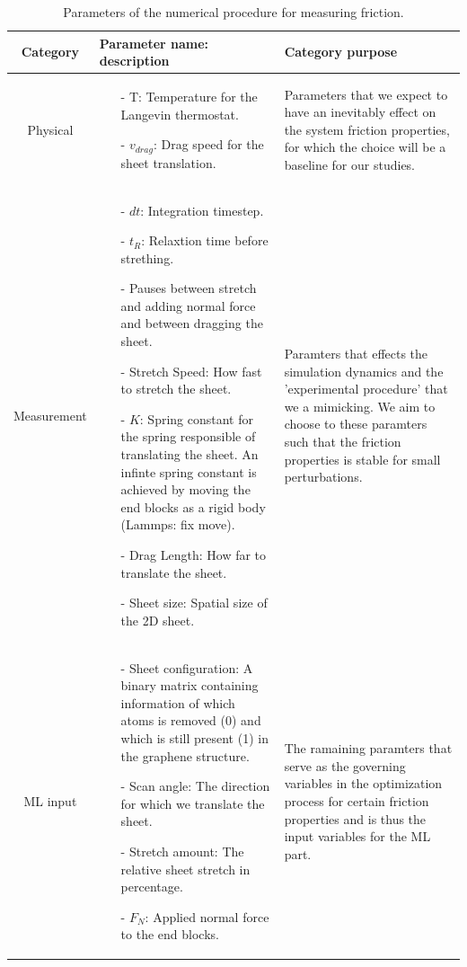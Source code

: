 \begin{table}[H]
  \begin{center}
  \caption{Parameters of the numerical procedure for measuring friction.}
  \label{tab:param}
  \begin{tabular}{ | c | m{8cm}| m{5cm}|} 
    \hline
    Category & Parameter name: description & Category purpose \\ 
    \hline
    Physical & 
    \begin{itemize}
      \item[-] T: Temperature for the Langevin thermostat.
      \item[-] $v_{drag}$: Drag speed for the sheet translation.
    \end{itemize} &
    Parameters that we expect to have an inevitably effect on the system friction properties, for which the choice will be a baseline for our studies.
    \\ \hline
    Measurement & 
    \begin{itemize}
      \item[-] $dt$: Integration timestep.
      \item[-] $t_R$: Relaxtion time before strething.
      \item[-] Pauses between stretch and adding normal force and between dragging the sheet.  
      \item[-] Stretch Speed: How fast to stretch the sheet.
      \item[-] $K$: Spring constant for the spring responsible of translating the sheet. An infinte spring constant is achieved by moving the end blocks as a rigid body (Lammps: fix move).
      \item[-] Drag Length: How far to translate the sheet.
      \item[-] Sheet size: Spatial size of the 2D sheet.  
    \end{itemize} &
    Paramters that effects the simulation dynamics and the 'experimental procedure' that we a mimicking. We aim to choose to these paramters such that the friction properties is stable for small perturbations.  \\ \hline
    ML input & 
    \begin{itemize}
      \item[-] Sheet configuration: A binary matrix containing information of which atoms is removed (0) and which is still present (1) in the graphene structure.
      \item[-] Scan angle: The direction for which we translate the sheet.
      \item[-] Stretch amount: The relative sheet stretch in percentage.
      \item[-] $F_N$: Applied normal force to the end blocks.
    \end{itemize} &
    The ramaining paramters that serve as the governing variables in the optimization process for certain friction properties and is thus the input variables for the ML part. 
    \\ \hline
  \end{tabular}
  \end{center}
\end{table}


